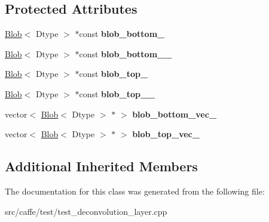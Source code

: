 \subsection*{Protected Attributes}
\begin{DoxyCompactItemize}
\item 
\mbox{\label{classcaffe_1_1_deconvolution_layer_test_a29ee4ffb0633dbeac0bc425b764eba90}} 
\mbox{\hyperlink{classcaffe_1_1_blob}{Blob}}$<$ Dtype $>$ $\ast$const {\bfseries blob\+\_\+bottom\+\_\+}
\item 
\mbox{\label{classcaffe_1_1_deconvolution_layer_test_a65b4f40e92930928feedd2aa1490d0dd}} 
\mbox{\hyperlink{classcaffe_1_1_blob}{Blob}}$<$ Dtype $>$ $\ast$const {\bfseries blob\+\_\+bottom\+\_\+\_\+}
\item 
\mbox{\label{classcaffe_1_1_deconvolution_layer_test_a04255d3c2eb526c88d843d1be06a1729}} 
\mbox{\hyperlink{classcaffe_1_1_blob}{Blob}}$<$ Dtype $>$ $\ast$const {\bfseries blob\+\_\+top\+\_\+}
\item 
\mbox{\label{classcaffe_1_1_deconvolution_layer_test_a3200cbb952dcb8028357242ea7372027}} 
\mbox{\hyperlink{classcaffe_1_1_blob}{Blob}}$<$ Dtype $>$ $\ast$const {\bfseries blob\+\_\+top\+\_\+\_\+}
\item 
\mbox{\label{classcaffe_1_1_deconvolution_layer_test_a7d29e0e7578acaa2aaf0f1366ed8846b}} 
vector$<$ \mbox{\hyperlink{classcaffe_1_1_blob}{Blob}}$<$ Dtype $>$ $\ast$ $>$ {\bfseries blob\+\_\+bottom\+\_\+vec\+\_\+}
\item 
\mbox{\label{classcaffe_1_1_deconvolution_layer_test_ab9e38cd6a1f5aa7433abfe43158ae4e7}} 
vector$<$ \mbox{\hyperlink{classcaffe_1_1_blob}{Blob}}$<$ Dtype $>$ $\ast$ $>$ {\bfseries blob\+\_\+top\+\_\+vec\+\_\+}
\end{DoxyCompactItemize}
\subsection*{Additional Inherited Members}


The documentation for this class was generated from the following file\+:\begin{DoxyCompactItemize}
\item 
src/caffe/test/test\+\_\+deconvolution\+\_\+layer.\+cpp\end{DoxyCompactItemize}

